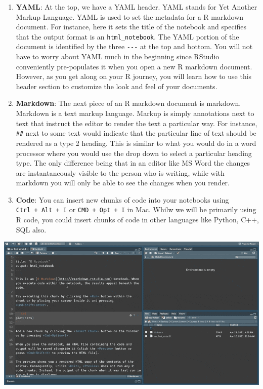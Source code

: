 \documentclass[
]{book}
\providecommand{\tightlist}{%
  \setlength{\itemsep}{0pt}\setlength{\parskip}{0pt}}
\begin{document}
\begin{enumerate}
\def\labelenumi{\arabic{enumi}.}
\tightlist
\item
  \textbf{YAML}: At the top, we have a YAML header. YAML stands for Yet Another Markup Language. YAML is used to set the metadata for a R markdown document. For instance, here it sets the title of the notebook and specifies that the output format is an \texttt{html\_notebook}. The YAML portion of the document is identified by the three \texttt{-\/-\/-} at the top and bottom. You will not have to worry about YAML much in the beginning since RStudio conveniently pre-populates it when you open a new R markdown document. However, as you get along on your R journey, you will learn how to use this header section to customize the look and feel of your documents.
\item
  \textbf{Markdown}: The next piece of an R markdown document is markdown. Markdown is a text markup language. Markup is simply annotations next to text that instruct the editor to render the text a particular way. For instance, \texttt{\#\#} next to some text would indicate that the particular line of text should be rendered as a type 2 heading. This is similar to what you would do in a word processor where you would use the drop down to select a particular heading type. The only difference being that in an editor like MS Word the changes are instantaneously visible to the person who is writing, while with markdown you will only be able to see the changes when you render.
\item
  \textbf{Code}: You can insert new chunks of code into your notebooks using \texttt{Ctrl\ +\ Alt\ +\ I} or \texttt{CMD\ +\ Opt\ +\ I} in Mac. Whilw we will be primarily using R code, you could insert chunks of code in other languages like Python, C++, SQL also.
\end{enumerate}

\includegraphics{assets/ch_2-notebooks/gifs/notebook_anatomy.gif}
\end{document}
